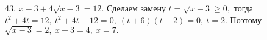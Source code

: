 43. $x-3+4\sqrt{x-3}=12.$ Сделаем замену $t=\sqrt{x-3}\geqslant0,$ тогда $t^2+4t=12,\ t^2+4t-12=0,\ (t+6)(t-2)=0,\ t=2.$ Поэтому $\sqrt{x-3}=2,\ x-3=4,\ x=7.$\\
